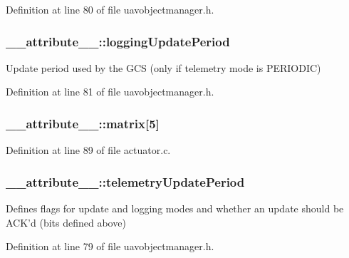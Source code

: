 Definition at line 80 of file uavobjectmanager.\-h.

\hypertarget{struct____attribute_____a85a81b55d67790a728b95eee989f17ed}{
\subsubsection[{logging\-Update\-Period}]{ \-\_\-\-\_\-attribute\-\_\-\-\_\-\-::logging\-Update\-Period}}\label{struct____attribute_____a85a81b55d67790a728b95eee989f17ed}
Update period used by the G\-C\-S (only if telemetry mode is P\-E\-R\-I\-O\-D\-I\-C) 

Definition at line 81 of file uavobjectmanager.\-h.

\hypertarget{struct____attribute_____a443b6e5347cb65e8a297b596be99e467}{
\subsubsection[{matrix}]{ \-\_\-\-\_\-attribute\-\_\-\-\_\-\-::matrix\mbox{[}5\mbox{]}}}\label{struct____attribute_____a443b6e5347cb65e8a297b596be99e467}


Definition at line 89 of file actuator.\-c.

\hypertarget{struct____attribute_____a07d69a32a8cbb34c8dc822e7bf30f73e}{
\subsubsection[{telemetry\-Update\-Period}]{ \-\_\-\-\_\-attribute\-\_\-\-\_\-\-::telemetry\-Update\-Period}}\label{struct____attribute_____a07d69a32a8cbb34c8dc822e7bf30f73e}
Defines flags for update and logging modes and whether an update should be A\-C\-K'd (bits defined above) 

Definition at line 79 of file uavobjectmanager.\-h.

